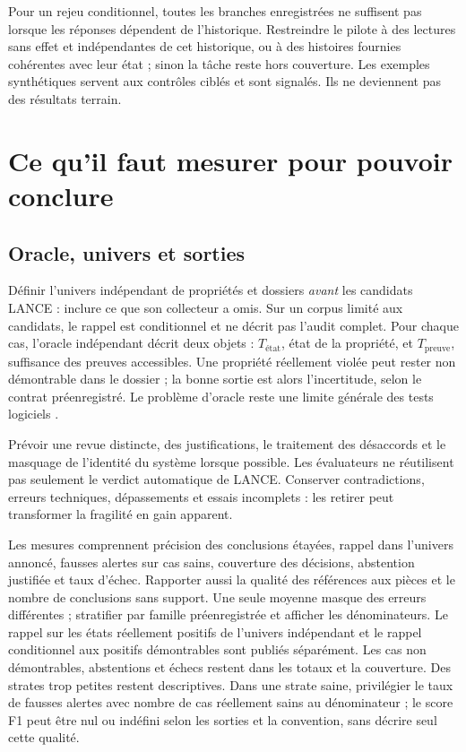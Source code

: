 \documentclass[11pt,a4paper]{article}
\begin{document}
Pour un rejeu conditionnel, toutes les branches enregistrées ne suffisent
pas lorsque les réponses dépendent de l'historique. Restreindre le pilote à
des lectures sans effet et indépendantes de cet historique, ou à des histoires
fournies cohérentes avec leur état ; sinon la tâche reste hors couverture.
Les exemples synthétiques servent aux contrôles ciblés et sont signalés.
Ils ne deviennent pas des résultats terrain.

\section{Ce qu'il faut mesurer pour pouvoir conclure}
\subsection{Oracle, univers et sorties}
Définir l'univers indépendant de propriétés et dossiers \emph{avant} les
candidats LANCE : inclure ce que son collecteur a omis. Sur un corpus limité
aux candidats, le rappel est conditionnel et ne décrit pas l'audit complet.
Pour chaque cas, l'oracle indépendant décrit deux objets : $T_{\text{état}}$,
état de la propriété, et $T_{\text{preuve}}$, suffisance des preuves
accessibles. Une propriété réellement violée peut
rester non démontrable dans le dossier ; la bonne sortie est alors l'incertitude,
selon le contrat préenregistré. Le problème d'oracle reste une limite générale
des tests logiciels \cite{experiences}.

Prévoir une revue distincte, des justifications, le traitement des désaccords
et le masquage de l'identité du système lorsque possible. Les évaluateurs ne
réutilisent pas seulement le verdict automatique de LANCE. Conserver
contradictions, erreurs techniques, dépassements et essais incomplets : les
retirer peut transformer la fragilité en gain apparent.

Les mesures comprennent précision des conclusions étayées, rappel dans
l'univers annoncé, fausses alertes sur cas sains, couverture des décisions,
abstention justifiée et taux d'échec. Rapporter aussi la qualité des références
aux pièces et le nombre de conclusions sans support. Une seule moyenne masque
des erreurs différentes ; stratifier par famille préenregistrée et afficher les
dénominateurs. Le rappel sur les états réellement positifs de l'univers
indépendant et le rappel conditionnel aux positifs démontrables sont publiés
séparément. Les cas non démontrables, abstentions et échecs restent dans les
totaux et la couverture. Des strates trop petites restent descriptives.
Dans une strate saine, privilégier le taux de fausses alertes avec nombre
de cas réellement sains au dénominateur ; le score F1 peut être nul ou
indéfini selon les sorties et la convention, sans décrire seul cette qualité.
\end{document}
